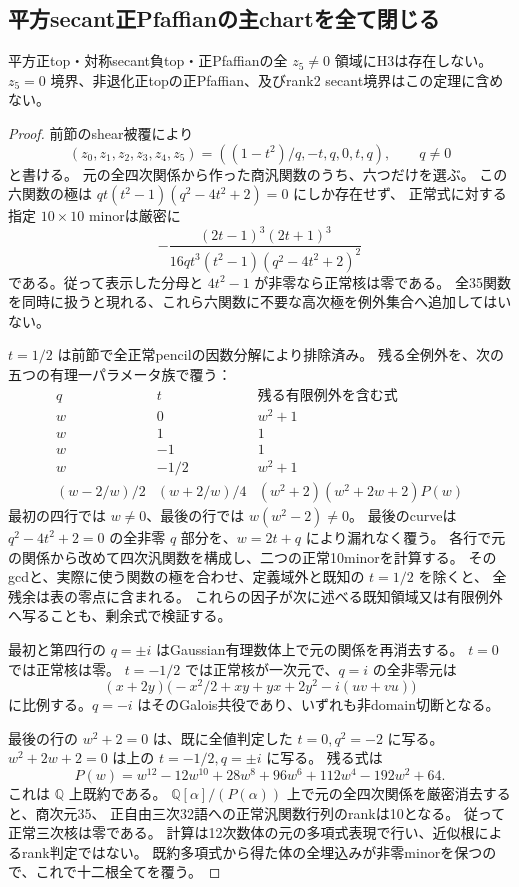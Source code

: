 \subsection{平方secant正Pfaffianの主chartを全て閉じる}
\begin{theorem}\label{thm:h3-order2-22-secant-square-main-empty}
平方正top・対称secant負top・正Pfaffianの全 $z_5\ne0$ 領域にH3は存在しない。
$z_5=0$ 境界、非退化正topの正Pfaffian、及びrank2 secant境界はこの定理に含めない。
\end{theorem}
\begin{proof}
前節のshear被覆により
\[
 (z_0,z_1,z_2,z_3,z_4,z_5)=((1-t^2)/q,-t,q,0,t,q),\qquad q\ne0
\]
と書ける。
元の全四次関係から作った商汎関数のうち、六つだけを選ぶ。
この六関数の極は $q t(t^2-1)(q^2-4t^2+2)=0$ にしか存在せず、
正常式に対する指定 $10\times10$ minorは厳密に
\[
 -\frac{(2t-1)^3(2t+1)^3}
 {16q t^3(t^2-1)(q^2-4t^2+2)^2}
\]
である。従って表示した分母と $4t^2-1$ が非零なら正常核は零である。
全35関数を同時に扱うと現れる、これら六関数に不要な高次極を例外集合へ追加してはいない。

$t=1/2$ は前節で全正常pencilの因数分解により排除済み。
残る全例外を、次の五つの有理一パラメータ族で覆う：
\[
\begin{array}{c|c|c}
 q&t&\text{残る有限例外を含む式}\\\hline
 w&0&w^2+1\\
 w&1&1\\
 w&-1&1\\
 w&-1/2&w^2+1\\
 (w-2/w)/2&(w+2/w)/4&(w^2+2)(w^2+2w+2)P(w)
\end{array}
\]
最初の四行では $w\ne0$、最後の行では $w(w^2-2)\ne0$。
最後のcurveは $q^2-4t^2+2=0$ の全非零 $q$ 部分を、$w=2t+q$ により漏れなく覆う。
各行で元の関係から改めて四次汎関数を構成し、二つの正常10minorを計算する。
そのgcdと、実際に使う関数の極を合わせ、定義域外と既知の $t=1/2$ を除くと、
全残余は表の零点に含まれる。
これらの因子が次に述べる既知領域又は有限例外へ写ることも、剰余式で検証する。

最初と第四行の $q=\pm i$ はGaussian有理数体上で元の関係を再消去する。
$t=0$ では正常核は零。
$t=-1/2$ では正常核が一次元で、$q=i$ の全非零元は
\[
 (x+2y)\bigl(-x^2/2+xy+yx+2y^2-i(uv+vu)\bigr)
\]
に比例する。$q=-i$ はそのGalois共役であり、いずれも非domain切断となる。

最後の行の $w^2+2=0$ は、既に全値判定した $t=0,q^2=-2$ に写る。
$w^2+2w+2=0$ は上の $t=-1/2,q=\pm i$ に写る。
残る式は
\[
 P(w)=w^{12}-12w^{10}+28w^8+96w^6+112w^4-192w^2+64.
\]
これは $\mathbb Q$ 上既約である。
$\mathbb Q[\alpha]/(P(\alpha))$ 上で元の全四次関係を厳密消去すると、商次元35、
正自由三次32語への正常汎関数行列のrankは10となる。
従って正常三次核は零である。
計算は12次数体の元の多項式表現で行い、近似根によるrank判定ではない。
既約多項式から得た体の全埋込みが非零minorを保つので、これで十二根全てを覆う。


\end{proof}
